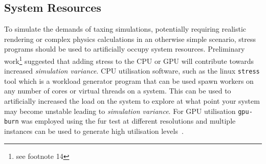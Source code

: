 \documentclass[letterpaper, 10 pt, journal, twoside]{IEEEtran}
\begin{document}
 
\subsection{System Resources}
To simulate the demands of taxing simulations, potentially requiring realistic rendering or complex physics calculations in an otherwise simple scenario, stress programs should be used to artificially occupy system resources. Preliminary work\footnote{see footnote 14} suggested that adding stress to the CPU or GPU will  contribute towards increased \textit{simulation variance}. CPU utilisation software, such as the linux \texttt{stress} tool which is a workload generator program that can be used spawn workers on any number of cores or virtual threads on a system. This can be used to artificially increased the load on the system to explore at what point your system may become unstable leading to \textit{simulation variance}. For GPU utilisation \texttt{gpu-burn} was employed using the fur test at different resolutions and multiple instances can be used to generate high utilisation levels~\cite{GPU_stress}.


\end{document}
